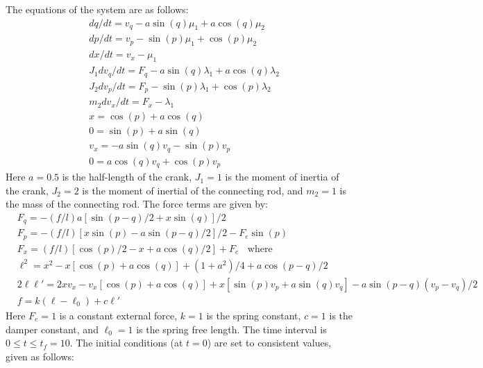The equations of the system are as follows:
\begin{equation*}
\begin{split}
  &dq/dt = v_q - a \sin(q) \mu_1 + a \cos(q) \mu_2 \\
  &dp/dt = v_p - \sin(p) \mu_1 + \cos(p) \mu_2 \\
  &dx/dt = v_x - \mu_1 \\
  &J_1 dv_q/dt = F_q - a \sin(q) \lambda_1 + a \cos(q) \lambda_2 \\
  &J_2 dv_p/dt = F_p - \sin(p) \lambda_1 + \cos(p) \lambda_2 \\
  &m_2 dv_x/dt = F_x - \lambda_1 \\
  &x = \cos(p) + a \cos(q) \\
  &0 = \sin(p) + a \sin(q) \\
  &v_x = -a \sin(q) v_q - \sin(p) v_p \\
  &0 = a \cos(q) v_q + \cos(p) v_p
\end{split}
\end{equation*}
Here $a = 0.5$ is the half-length of the crank, $J_1 = 1$ is the moment of
inertia of the crank, $J_2 = 2$ is the moment of inertial of the connecting rod,
and $m_2 = 1$ is the mass of the connecting rod.  The force terms are given by:
\begin{equation*}
\begin{split}
  &F_q = - (f/l) a [\sin(p-q)/2 + x \sin(q)]/2 \\
  &F_p = - (f/l) [ x \sin(p) - a \sin(p-q)/2]/2 - F_e \sin(p) \\
  &F_x = (f/l) [\cos(p)/2 - x + a \cos(q)/2 ] + F_e ~~~~ \mbox{where}  \\
  &\ell^2 = x^2 - x [\cos(p) + a\cos(q)] + (1 + a^2)/4 + a \cos(p-q)/2 \\
  &2 \ell {\ell}' = 2 x v_x - v_x [\cos(p) + a\cos(q)] + x [\sin(p)v_p + a\sin(q)v_q]
                   - a \sin(p-q) (v_p-v_q)/2 \\
  &f = k (\ell - \ell_0) + c {\ell}'
\end{split}
\end{equation*}
Here $F_e = 1$ is a constant external force, $k = 1$ is the spring constant,
$c = 1$ is the damper constant, and $\ell_0 = 1$ is the spring free length.
The time interval is $0 \leq t \leq t_f = 10$.  The initial conditions (at $t = 0$)
are set to consistent values, given as follows:
